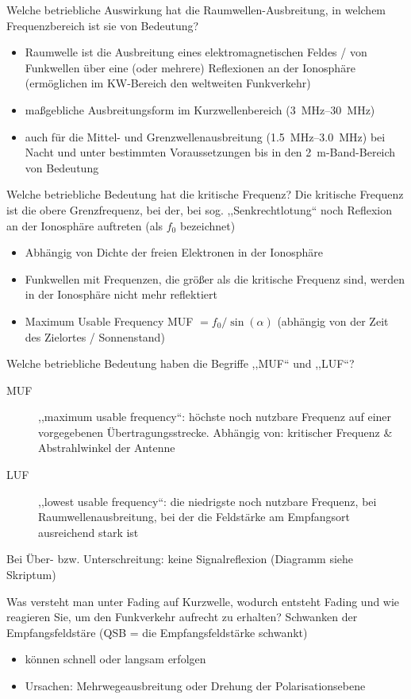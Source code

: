 \documentclass[avery5371,grid,frame,a4paper]{flashcards}
\newcommand{\card}[3]{
  \begin{flashcard}[{\chap} -- #1]{#2}#3\end{flashcard}
}
\begin{document}
\card{09}{Welche betriebliche Auswirkung hat die Raumwellen-Ausbreitung, in welchem Frequenzbereich ist sie von Bedeutung?}{
  \small
  \begin{itemize}
    \item Raumwelle ist die Ausbreitung eines elektromagnetischen Feldes / von Funkwellen über eine (oder mehrere) Reflexionen an der Ionosphäre (ermöglichen im KW-Bereich den weltweiten Funkverkehr)
    \item maßgebliche Ausbreitungsform im Kurzwellenbereich (\SIrange{3}{30}{\mega\Hz})
    \item auch für die Mittel- und Grenzwellenausbreitung (\SIrange{1,5}{3,0}{\mega\Hz}) bei Nacht und unter bestimmten Voraussetzungen bis in den \SI{2}{\metre}-Band-Bereich von Bedeutung
  \end{itemize}
}
\card{10}{Welche betriebliche Bedeutung hat die kritische Frequenz?}{
  \small
  Die kritische Frequenz ist die obere Grenzfrequenz, bei der, bei sog. ,,Senkrechtlotung`` noch Reflexion an der Ionosphäre auftreten (als $f_0$ bezeichnet)
  \begin{itemize}
    \item Abhängig von Dichte der freien Elektronen in der Ionosphäre
    \item Funkwellen mit Frequenzen, die größer als die kritische Frequenz sind, werden in der Ionosphäre nicht mehr reflektiert
    \item Maximum Usable Frequency MUF $= f_0 / \sin(\alpha)$ (abhängig von der Zeit des Zielortes / Sonnenstand)
  \end{itemize}
}
\card{11}{Welche betriebliche Bedeutung haben die Begriffe ,,MUF`` und ,,LUF``?}{
  \small
  \begin{description}
    \item[MUF] ,,maximum usable frequency``: höchste noch nutzbare Frequenz auf einer vorgegebenen Übertragungsstrecke. Abhängig von: kritischer Frequenz \& Abstrahlwinkel der Antenne
    \item[LUF] ,,lowest usable frequency``: die niedrigste noch nutzbare Frequenz, bei Raumwellenausbreitung, bei der die Feldstärke am Empfangsort ausreichend stark ist
  \end{description}
  Bei Über- bzw. Unterschreitung: keine Signalreflexion (Diagramm siehe Skriptum)
}
\card{12}{Was versteht man unter Fading auf Kurzwelle, wodurch entsteht Fading und wie reagieren Sie, um den Funkverkehr aufrecht zu erhalten?}{
  Schwanken der Empfangsfeldstäre (QSB = die Empfangsfeldstärke schwankt)
  \begin{itemize}
    \item können schnell oder langsam erfolgen
    \item Ursachen: Mehrwegeausbreitung oder Drehung der Polarisationsebene
  \end{itemize}
}
\end{document}
